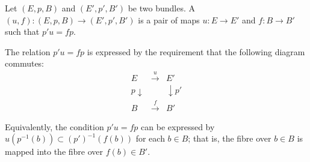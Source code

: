 Let $(E, p, B)$ and $(E', p', B')$ be two bundles. A  $(u, f): (E, p, B) \rightarrow (E', p', B')$ is a pair of maps $u: E \rightarrow E'$ and $f: B \rightarrow B'$ such that $p'u = fp$.

The relation $p'u = fp$ is expressed by the requirement that the following diagram commutes:
\[
\begin{array}{ccc}
E & \xrightarrow{u} & E' \\
p\downarrow & & \downarrow p' \\
B & \xrightarrow{f} & B'
\end{array}
\]

Equivalently, the condition $p'u = fp$ can be expressed by $u(p^{-1}(b)) \subset (p')^{-1}(f(b))$ for each $b \in B$; that is, the fibre over $b \in B$ is mapped into the fibre over $f(b) \in B'$.
